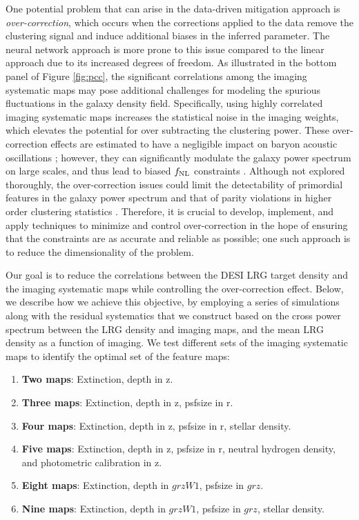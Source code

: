 One potential problem that can arise in the data-driven mitigation approach is \textit{over-correction}, which occurs when the corrections applied to the data remove the clustering signal and induce additional biases in the inferred parameter. The neural network approach is more prone to this issue compared to the linear approach due to its increased degrees of freedom. As illustrated in the bottom panel of Figure \ref{fig:pcc}, the significant correlations among the imaging systematic maps may pose additional challenges for modeling the spurious fluctuations in the galaxy density field. Specifically, using highly correlated imaging systematic maps increases the statistical noise in the imaging weights, which elevates the potential for over subtracting the clustering power. These over-correction effects are estimated to have a negligible impact on baryon acoustic oscillations \citep{merz2021clustering}; however, they can significantly modulate the galaxy power spectrum on large scales, and thus lead to biased $f_{\rm NL}$ constraints \citep{rezaie2021primordial, mueller2022primordial}. Although not explored thoroughly, the over-correction issues could limit the detectability of primordial features in the galaxy power spectrum and that of parity violations in higher order clustering statistics \citep{beutler2019primordial, cahn2021test, philcox2022probing}. Therefore, it is crucial to develop, implement, and apply techniques to minimize and control over-correction in the hope of ensuring that the constraints are as accurate and reliable as possible; one such approach is to reduce the dimensionality of the problem. 

Our goal is to reduce the correlations between the DESI LRG target density and the imaging systematic maps while controlling the over-correction effect. Below, we describe how we achieve this objective, by employing a series of simulations along with the residual systematics that we construct based on the cross power spectrum between the LRG density and imaging maps, and the mean LRG density as a function of imaging. We test different sets of the imaging systematic maps to identify the optimal set of the feature maps:
\begin{enumerate}[itemindent=*]
\item \textbf{Two maps}: Extinction, depth in z.
\item \textbf{Three maps}: Extinction, depth in z, psfsize in r.
\item \textbf{Four maps}: Extinction, depth in z, psfsize in r, stellar density.
\item \textbf{Five maps}: Extinction, depth in z, psfsize in r, neutral hydrogen density, and photometric calibration in z.
\item \textbf{Eight maps}: Extinction, depth in $grzW1$, psfsize in $grz$.
\item \textbf{Nine maps}: Extinction, depth in $grzW1$, psfsize in $grz$, stellar density.
\end{enumerate}

